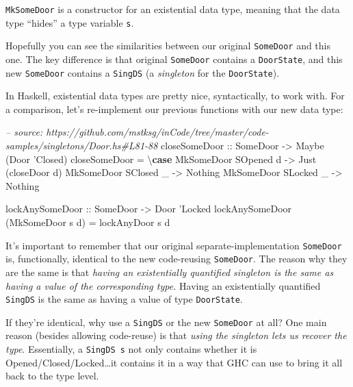 \documentclass[]{article}
\newenvironment{Shaded}{}{}
\newcommand{\KeywordTok}[1]{\textcolor[rgb]{0.00,0.44,0.13}{\textbf{#1}}}
\newcommand{\DataTypeTok}[1]{\textcolor[rgb]{0.56,0.13,0.00}{#1}}
\newcommand{\CharTok}[1]{\textcolor[rgb]{0.25,0.44,0.63}{#1}}
\newcommand{\CommentTok}[1]{\textcolor[rgb]{0.38,0.63,0.69}{\textit{#1}}}
\newcommand{\OtherTok}[1]{\textcolor[rgb]{0.00,0.44,0.13}{#1}}
\newcommand{\FunctionTok}[1]{\textcolor[rgb]{0.02,0.16,0.49}{#1}}
\newcommand{\NormalTok}[1]{#1}
\begin{document}
\texttt{MkSomeDoor} is a constructor for an existential data type, meaning that
the data type ``hides'' a type variable \texttt{s}.

Hopefully you can see the similarities between our original \texttt{SomeDoor}
and this one. The key difference is that original \texttt{SomeDoor} contains a
\texttt{DoorState}, and this new \texttt{SomeDoor} contains a \texttt{SingDS} (a
\emph{singleton} for the \texttt{DoorState}).

In Haskell, existential data types are pretty nice, syntactically, to work with.
For a comparison, let's re-implement our previous functions with our new data
type:

\begin{Shaded}
\begin{Highlighting}[]
\CommentTok{-- source: https://github.com/mstksg/inCode/tree/master/code-samples/singletons/Door.hs#L81-88}
\OtherTok{closeSomeDoor ::} \DataTypeTok{SomeDoor} \OtherTok{->} \DataTypeTok{Maybe}\NormalTok{ (}\DataTypeTok{Door} \CharTok{'Closed)}
\NormalTok{closeSomeDoor }\FunctionTok{=}\NormalTok{ \textbackslash{}}\KeywordTok{case}
    \DataTypeTok{MkSomeDoor} \DataTypeTok{SOpened}\NormalTok{ d }\OtherTok{->} \DataTypeTok{Just}\NormalTok{ (closeDoor d)}
    \DataTypeTok{MkSomeDoor} \DataTypeTok{SClosed}\NormalTok{ _ }\OtherTok{->} \DataTypeTok{Nothing}
    \DataTypeTok{MkSomeDoor} \DataTypeTok{SLocked}\NormalTok{ _ }\OtherTok{->} \DataTypeTok{Nothing}

\OtherTok{lockAnySomeDoor ::} \DataTypeTok{SomeDoor} \OtherTok{->} \DataTypeTok{Door} \CharTok{'Locked}
\NormalTok{lockAnySomeDoor (}\DataTypeTok{MkSomeDoor}\NormalTok{ s d) }\FunctionTok{=}\NormalTok{ lockAnyDoor s d}
\end{Highlighting}
\end{Shaded}

It's important to remember that our original separate-implementation
\texttt{SomeDoor} is, functionally, identical to the new code-reusing
\texttt{SomeDoor}. The reason why they are the same is that \emph{having an
existentially quantified singleton is the same as having a value of the
corresponding type.} Having an existentially quantified \texttt{SingDS} is the
same as having a value of type \texttt{DoorState}.

If they're identical, why use a \texttt{SingDS} or the new \texttt{SomeDoor} at
all? One main reason (besides allowing code-reuse) is that \emph{using the
singleton lets us recover the type}. Essentially, a \texttt{SingDS\ s} not only
contains whether it is Opened/Closed/Locked\ldots{}it contains it in a way that
GHC can use to bring it all back to the type level.
\end{document}
